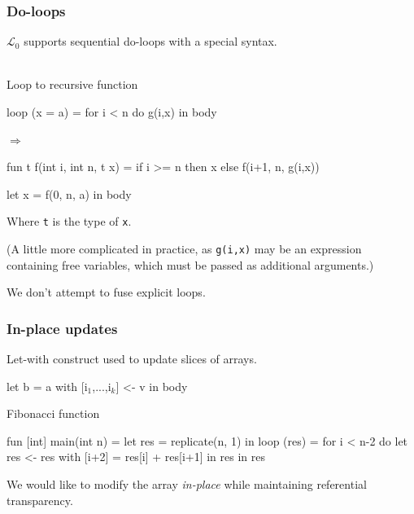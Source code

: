 \documentclass{beamer}
\renewcommand{\emph}[1]{\textcolor{structure}{#1}}
\newcommand{\emp}[1]{\textcolor{DikuRed}{ #1}}
\newcommand{\mymath}[1]{$ #1 $}
\newcommand{\myindx}[1]{_{#1}}
\newcommand{\LO}{$\mathcal{L}_0$}
\begin{document}
\begin{frame}[fragile,t]
  \frametitle{Do-loops}

  \LO{} supports sequential do-loops with a special syntax.\\
  \hfill\\
  \begin{block}{Loop to recursive function}
    \begin{minipage}{0.2\columnwidth}
      \begin{colorcode}
loop (x = a) =
  for i < n do
    \emp{g(i,x)}
in \emph{body}
      \end{colorcode}
    \end{minipage}
    \pause
    \begin{minipage}{0.05\columnwidth}
      $\Rightarrow$
    \end{minipage}
    \begin{minipage}{0.1\columnwidth}
      \begin{colorcode}
fun t f(int i, int n, t x) =
  if i >= n
    then x
    else f(i+1, n, \emp{g(i,x)})

let x = f(0, n, a)
in \emph{body}
      \end{colorcode}
    \end{minipage}
  \end{block}

  Where {\tt t} is the type of {\tt x}.

  (A little more complicated in practice, as {\tt g(i,x)} may be an
  expression containing free variables, which must be passed as
  additional arguments.)

  We don't attempt to fuse explicit loops.

\end{frame}

\begin{frame}[fragile,t]
  \frametitle{In-place updates}

  Let-with construct used to update slices of arrays.

  \begin{colorcode}
    let b = a with [i\mymath{\myindx{1}},...,i\mymath{\myindx{k}}] <- v
    in body
  \end{colorcode}

  \pause

  \begin{block}{Fibonacci function}
    \begin{colorcode}
fun [int] main(int n) =
  let res = replicate(n, 1) in
  loop (res) = for i < n-2 do
    let res <- res with [i+2] = res[i] + res[i+1] in
    res
  in res
    \end{colorcode}
  \end{block}

  We would like to modify the array {\em in-place} while maintaining
  referential transparency.

\end{frame}
\end{document}
